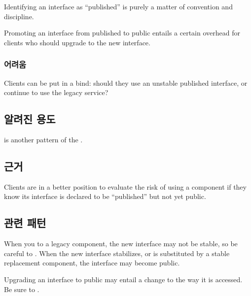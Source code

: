 \documentclass[a4paper,10pt,twoside]{book}
\begin{document}
\begin{bulletlist}
\item Identifying an interface as ``published'' is purely a matter of convention and discipline.

\item Promoting an interface from published to public entails a certain overhead for clients who should upgrade to the new interface.
\end{bulletlist}

\subsubsection*{어려움}

\begin{bulletlist}
\item Clients can be put in a bind: should they use an unstable published interface, or continue to use the legacy service?
\end{bulletlist}

\subsection*{알려진 용도}

 is another pattern of the  \cite{Ocal00a}.

\subsection*{근거}

Clients are in a better position to evaluate the risk of using a component if they know its interface is declared to be ``published'' but not yet public.

\subsection*{관련 패턴}

When you  to a legacy component, the new interface may not be stable, so be careful to . When the new interface stabilizes, or is substituted by a stable replacement component, the interface may become public.

Upgrading an interface to public may entail a change to the way it is accessed. Be sure to .
\end{document}
